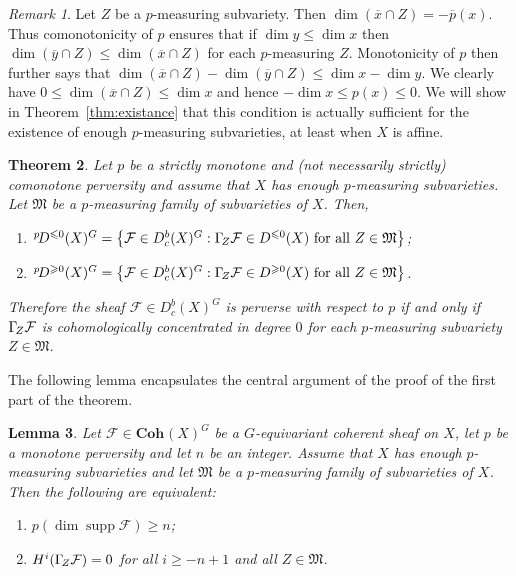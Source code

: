 \documentclass{compositio}
\theoremstyle{plain}
\newtheorem{Thm}{Theorem}
\newtheorem{Lem}[Thm]{Lemma}
\theoremstyle{definition}
\theoremstyle{remark}
\newtheorem{Rem}[Thm]{Remark}
\newcommand\sheaf{\mathcal}
\newcommand\cat{\mathbf}
\newcommand\catCoh[2][]{\cat{Coh}^{#1}(#2)}
\newcommand\supp{\operatorname{supp}}
\newcommand\perv[1][p]{\mkern1mu{}^{#1}\mkern-3mu}
\newcommand\lc[1]{\Gamma_{\mkern-3mu#1}}
\newcommand\measuringFam{\mathfrak M}
\begin{document}
\begin{Rem}\label{rem:existence}%
    Let $Z$ be a $p$-measuring subvariety.
    Then $\dim(\overline x \cap  Z) = -\overline p(x)$.
    Thus comonotonicity of $p$ ensures that if $\dim y \leq  \dim x$ then $\dim (\overline y \cap  Z) \leq  \dim (\overline x \cap  Z)$ for each $p$-measuring $Z$.
    Monotonicity of $p$ then further says that $\dim (\overline x \cap  Z) - \dim (\overline y \cap  Z) \leq  \dim x - \dim y$.
    We clearly have $0 \le \dim(\overline x \cap  Z) \le \dim x$ and hence $-\dim x \le p(x) \le 0$.
    We will show in Theorem~\ref{thm:existance} that this condition is actually sufficient for the existence of enough $p$-measuring subvarieties, at least when $X$ is affine.
\end{Rem}

\begin{Thm}\label{thm:main}%
    Let $p$ be a strictly monotone and (not necessarily strictly) comonotone perversity and assume that $X$ has enough $p$-measuring subvarieties.
    Let $\measuringFam$ be a $p$-measuring family of subvarieties of $X$.
    Then,
    \begin{enumerate}
        \item $\perv[p] D^{\leq 0}(X)^G = \left\{ \sheaf F \in  D_c^b(X)^G : \lc Z\sheaf F \in  D^{\leq 0}(X) \text{ for all $Z \in  \measuringFam$}\right\}$;
        \item $\perv[p] D^{\geq 0}(X)^G = \left\{ \sheaf F \in  D_c^b(X)^G : \lc Z\sheaf F \in  D^{\geq 0}(X) \text{ for all $Z \in  \measuringFam$}\right\}$.
    \end{enumerate}
    Therefore the sheaf $\sheaf F \in  D_c^b(X)^G$ is perverse with respect to $p$ if and only if $\lc Z\sheaf F$ is cohomologically concentrated in degree $0$ for each $p$-measuring subvariety $Z \in  \measuringFam$.
\end{Thm}

The following lemma encapsulates the central argument of the proof of the first part of the theorem.

\begin{Lem}\label{lem:supportAndLocalCohomology-}%
    Let $\sheaf F \in  \catCoh{X}^G$ be a $G$-equivariant coherent sheaf on $X$, let $p$ be a monotone perversity and let $n$ be an integer.
    Assume that $X$ has enough $p$-measuring subvarieties and let $\measuringFam$ be a $p$-measuring family of subvarieties of $X$.
    Then the following are equivalent:
    \begin{enumerate}
        \item $p(\dim \supp \sheaf F) \geq  n$;
        \item \label{li:lem:supportAndLocalCohomology-:2}%
            $H^i(\lc Z\sheaf F) = 0$ for all $i \geq  -n+1$ and all $Z \in  \measuringFam$.
    \end{enumerate}
\end{Lem}
\end{document}

